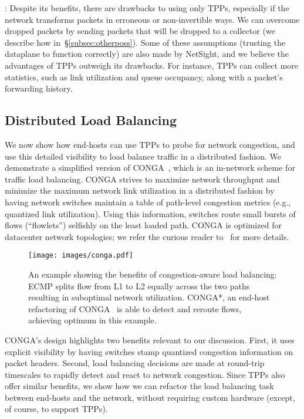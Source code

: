 : Despite its benefits, there are drawbacks to using only TPPs,
especially if the network transforms packets in erroneous or non-invertible ways.
We can overcome dropped packets by sending packets that will be
dropped to a collector (we describe how in~\S\ref{subsec:otherposs}).
Some of these assumptions (trusting the dataplane to function
correctly) are also made by NetSight, and we
believe the advantages of TPPs outweigh its drawbacks.  For instance,
TPPs can collect more statistics, such as link utilization and queue
occupancy, along with a packet's forwarding history.


\begin{ecam}
\subsection{Distributed Load Balancing}\label{subsec:conga}
We now show how end-hosts can use
TPPs to probe for network congestion, and use this detailed visibility to load
balance traffic in a distributed fashion.  We demonstrate a simplified
version of CONGA~\cite{conga}, which is an in-network scheme for
traffic load balancing.  CONGA strives to
maximize network throughput and minimize the maximum network link
utilization in a distributed fashion
by having network switches maintain a table of path-level congestion
metrics (e.g., quantized link utilization).  Using this information,
switches route small bursts of flows (``flowlets'') selfishly
on the least loaded path.  CONGA is optimized for datacenter
network topologies; we refer the curious reader to~\cite{conga}
for more details.
\begin{figure}[t]
\centering
\texttt{[image: images/conga.pdf]}
\caption{An example showing the benefits of congestion-aware load balancing:
ECMP splits flow from L1 to L2
equally across the two paths resulting in suboptimal network utilization.
CONGA*, an end-host refactoring of CONGA~\cite{conga} is able to detect
and reroute flows, achieving optimum in this example.}
\label{fig:conga}\vspace{-1em}
\end{figure}

CONGA's design highlights two benefits relevant to our discussion.
First, it uses explicit visibility by having switches stamp quantized
congestion information on packet headers.  Second, load balancing decisions
are made at round-trip timescales to rapidly detect and react to network
congestion.  Since TPPs also offer similar benefits, we show how we
can refactor the load balancing task between end-hosts and the network,
without requiring custom hardware (except, of course, to support TPPs).


\end{ecam}
